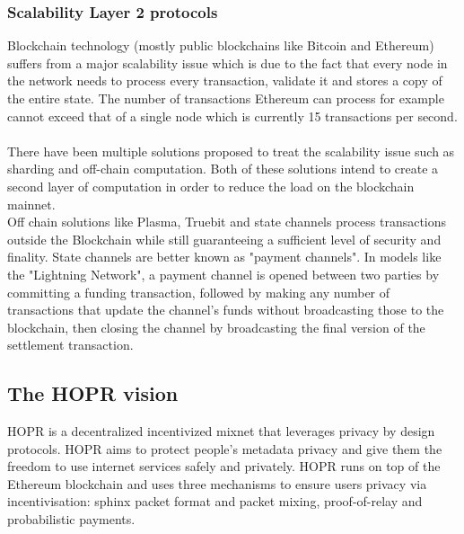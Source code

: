 \subsubsection{Scalability Layer 2 protocols}
Blockchain technology (mostly public blockchains like Bitcoin and Ethereum) suffers from a major scalability issue which is due to the fact that every node in the network needs to process every transaction, validate it and stores a copy of the entire state. The number of transactions Ethereum can process for example cannot exceed that of a single node which is currently 15 transactions per second.
\\~\\There have been multiple solutions proposed to treat the scalability issue such as sharding and off-chain computation. Both of these solutions intend to create a second layer of computation in order to reduce the load on the blockchain mainnet.
\\Off chain solutions like Plasma, Truebit and state channels process transactions outside the Blockchain while still guaranteeing a sufficient level of security and finality. State channels are better known as "payment channels". In models like the "Lightning Network", a payment channel is opened between two parties by committing a funding transaction, followed by making any number of transactions that update the channel's funds without broadcasting those to the blockchain, then closing the channel by broadcasting the final version of the settlement transaction.
\subsection{The HOPR vision}
HOPR is a decentralized incentivized mixnet that leverages privacy by design protocols. HOPR aims to protect people's metadata privacy and give them the freedom to use internet services safely and privately. HOPR runs on top of the Ethereum blockchain and uses three mechanisms to ensure users privacy via incentivisation: sphinx packet format and packet mixing, proof-of-relay and probabilistic payments.




 




